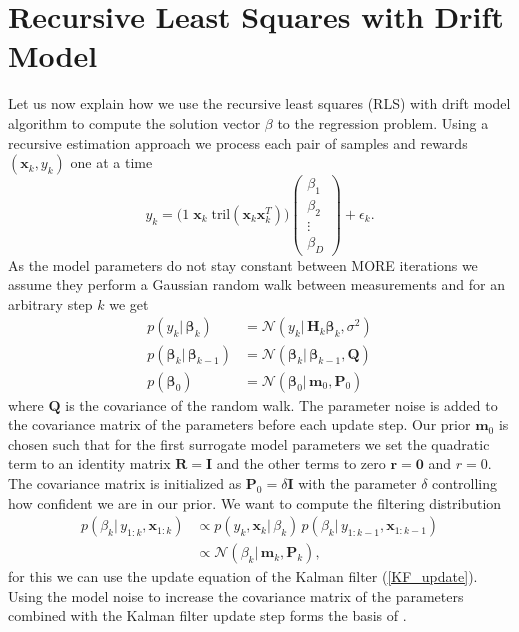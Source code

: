 \section{Recursive Least Squares with Drift Model}
\label{sec:rls}
Let us now explain how we use the recursive least squares (RLS) with
drift model algorithm 
to compute the solution vector $\beta$ to the regression problem.
Using a recursive estimation approach we
process each pair of samples and rewards $(\mathbf{x}_k, y_k)$ one at
a time
$$
 y_k =
 \big(1 \;  \mathbf{x}_k \; \text{tril}(\mathbf{x}_k \mathbf{x}_k^T) \big)
\begin{pmatrix}
  \beta_1 \\ \beta_2 \\ \vdots \\ \beta_D
\end{pmatrix} 
+ \epsilon_k.
$$
As the model parameters do not stay constant between MORE iterations
we assume they perform
a Gaussian random walk between measurements and for an arbitrary
step $k$ we get
\begin{align*}
  p(y_k | \, \mathbf{\beta}_k) &= \mathcal{N}(y_k | \, \mathbf{H}_k \mathbf{\beta}_k, \sigma^2) \\
  p(\mathbf{\beta}_k | \, \mathbf{\beta}_{k-1}) &= \mathcal{N}(\mathbf{\beta}_k | \,
                               \mathbf{\beta}_{k-1}, \mathbf{Q}) \\
  p(\mathbf{\beta}_0) &= \mathcal{N}(\mathbf{\beta}_0 | \, \mathbf{m}_0, \mathbf{P}_0)
\end{align*}
where $\mathbf{Q}$ is the covariance of the random walk.
The parameter noise is added to the covariance matrix of the parameters
before each update step.
Our prior $\mathbf{m}_0$ is chosen such that for the
first surrogate model parameters
we set the quadratic term to an identity matrix $\mathbf{R} = \mathbf{I}$
and the other terms to zero $ \mathbf{r} = \mathbf{0}$ and $ r = 0$.
The covariance matrix is initialized as
$\mathbf{P}_0 = \delta \mathbf{I}$ with
the parameter $\delta$ controlling how confident
we are in our prior.
We want to compute the filtering distribution
\begin{align*}
  p(\beta_k | \, y_{1:k}, \mathbf{x}_{1:k})
  &\propto p(y_k, \mathbf{x}_k | \, \beta_k) \,
    p(\beta_k |\, y_{1:k-1}, \mathbf{x}_{1:k-1}) \\
  &\propto \mathcal{N}(\beta_k | \, \mathbf{m}_k, \mathbf{P}_k), 
\end{align*}
for this we can use the update equation
of the Kalman filter (\ref{KF_update}). 
Using the model noise to increase the covariance matrix of the parameters
combined with
the Kalman filter update step
forms the basis of .

